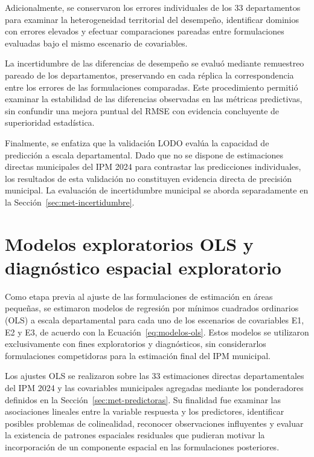 Adicionalmente, se conservaron los errores individuales de los 33 departamentos para examinar la heterogeneidad territorial del desempeño, identificar dominios con errores elevados y efectuar comparaciones pareadas entre formulaciones evaluadas bajo el mismo escenario de covariables.

La incertidumbre de las diferencias de desempeño se evaluó mediante remuestreo pareado de los departamentos, preservando en cada réplica la correspondencia entre los errores de las formulaciones comparadas. Este procedimiento permitió examinar la estabilidad de las diferencias observadas en las métricas predictivas, sin confundir una mejora puntual del RMSE con evidencia concluyente de superioridad estadística.

Finalmente, se enfatiza que la validación LODO evalúa la capacidad de predicción a escala departamental. Dado que no se dispone de estimaciones directas municipales del IPM 2024 para contrastar las predicciones individuales, los resultados de esta validación no constituyen evidencia directa de precisión municipal. La evaluación de incertidumbre municipal se aborda separadamente en la Sección~\ref{sec:met-incertidumbre}.



\section{Modelos exploratorios OLS y diagnóstico espacial exploratorio}
\label{sec:met-ols}

Como etapa previa al ajuste de las formulaciones de estimación en áreas pequeñas, se estimaron modelos de regresión por mínimos cuadrados ordinarios (OLS) a escala departamental para cada uno de los escenarios de covariables E1, E2 y E3, de acuerdo con la Ecuación~\ref{eq:modelos-ols}. Estos modelos se utilizaron exclusivamente con fines exploratorios y diagnósticos, sin considerarlos formulaciones competidoras para la estimación final del IPM municipal.

Los ajustes OLS se realizaron sobre las 33 estimaciones directas departamentales del IPM 2024 y las covariables municipales agregadas mediante los ponderadores definidos en la Sección~\ref{sec:met-predictoras}. Su finalidad fue examinar las asociaciones lineales entre la variable respuesta y los predictores, identificar posibles problemas de colinealidad, reconocer observaciones influyentes y evaluar la existencia de patrones espaciales residuales que pudieran motivar la incorporación de un componente espacial en las formulaciones posteriores.

